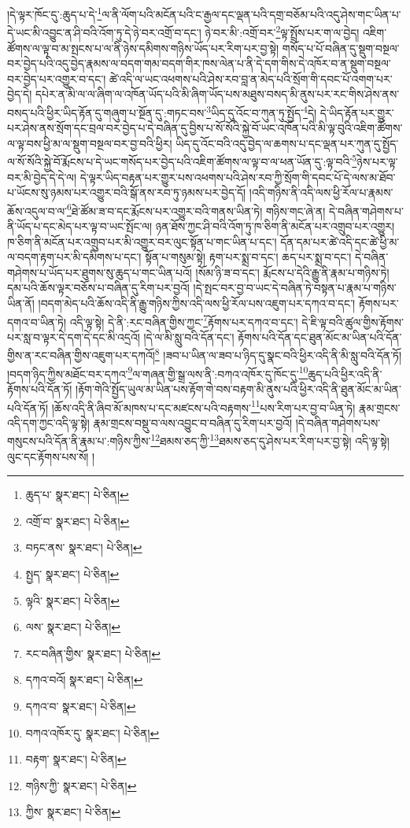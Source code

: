 །དེ་ལྟར་ཁོང་དུ་:ཆུད་པ་དེ་\footnote{ཆུད་པ་  སྣར་ཐང་།  པེ་ཅིན། }ལ་ནི་ལོག་པའི་མངོན་པའི་ང་རྒྱལ་དང་ལྡན་པའི་དགྲ་བཅོམ་པའི་འདུ་ཤེས་གང་ཡིན་པ་དེ་ཡང་མི་འབྱུང་ན་ཤི་བའི་འོག་ཏུ་དེ་ཉེ་བར་འགྲོ་བ་དང་། ཉེ་བར་མི་:འགྲོ་བར་\footnote{འགྲོ་བ་  སྣར་ཐང་།  པེ་ཅིན། }ལྟ་སྤྲོས་པར་ག་ལ་བྱེད། འཇིག་ཚོགས་ལ་ལྟ་བ་མ་སྤངས་པ་ལ་ནི་ཉེས་དམིགས་གཉིས་ཡོད་པར་རིག་པར་བྱ་སྟེ། གསོད་པ་པོ་བཞིན་དུ་སྡུག་བསྔལ་བར་བྱེད་པའི་འདུ་བྱེད་རྣམས་ལ་བདག་གམ་བདག་གིར་ཁས་ལེན་པ་ནི་དེ་དག་གིས་དེ་འཁོར་བ་ན་སྡུག་བསྔལ་བར་བྱེད་པར་འགྱུར་བ་དང་། ཚེ་འདི་ལ་ཡང་འཕགས་པའི་ཤེས་རབ་བླ་ན་མེད་པའི་སྲོག་གི་དབང་པོ་འགག་པར་བྱེད་དེ། དཔེར་ན་མི་ལ་ལ་ཞིག་ལ་འཁོན་ཡོད་པའི་མི་ཞིག་ཡོད་པས་མཐུས་བསད་མི་ནུས་པར་རང་གིས་ཤེས་ནས་བསད་པའི་ཕྱིར་ཡིད་རྟོན་དུ་གཞུག་པ་སྔོན་དུ་:གཏང་བས་\footnote{བཏང་ནས་  སྣར་ཐང་།  པེ་ཅིན། }ཡིད་དུ་འོང་བ་ཀུན་ཏུ་སྤྱོད་\footnote{སྤྱད་  སྣར་ཐང་།  པེ་ཅིན། }དེ། དེ་ཡིད་རྟོན་པར་གྱུར་པར་ཤེས་ནས་སྲོག་དང་བྲལ་བར་བྱེད་པ་དེ་བཞིན་དུ་བྱིས་པ་སོ་སོའི་སྐྱེ་བོ་ཡང་འཁོན་པའི་མི་ལྟ་བུའི་འཇིག་ཚོགས་ལ་ལྟ་བས་ཕྱི་མ་ལ་སྡུག་བསྔལ་བར་བྱ་བའི་ཕྱིར། ཡིད་དུ་འོང་བའི་འདུ་བྱེད་ལ་ཆགས་པ་དང་ལྡན་པར་ཀུན་དུ་སྤྱོད་ལ་སོ་སོའི་སྐྱེ་བོ་རྨོངས་པ་དེ་ཡང་གསོད་པར་བྱེད་པའི་འཇིག་ཚོགས་ལ་ལྟ་བ་ལ་ཕན་ཡོན་དུ་:ལྟ་བའི་\footnote{ལྟའི་  སྣར་ཐང་།  པེ་ཅིན། }ཉེས་པར་ལྟ་བར་མི་བྱེད་དེ་དེ་ལ། དེ་ལྟར་ཡིད་བརྟན་པར་གྱུར་པས་འཕགས་པའི་ཤེས་རབ་ཀྱི་སྲོག་གི་དབང་པོ་དེ་ལས་མ་ཐོབ་པ་ཡོངས་སུ་ཉམས་པར་འགྱུར་བའི་སྒོ་ནས་རབ་ཏུ་ཉམས་པར་བྱེད་དོ། །འདི་གཉིས་ནི་འདི་ལས་ཕྱི་རོལ་པ་རྣམས་ཆོས་འདུལ་བ་ལ་\footnote{ལས་  སྣར་ཐང་།  པེ་ཅིན། }ཐེ་ཚོམ་ཟ་བ་དང་རྨོངས་པར་འགྱུར་བའི་གནས་ཡིན་ཏེ། གཉིས་གང་ཞེ་ན། དེ་བཞིན་གཤེགས་པ་ནི་ཡོད་པ་དང་མེད་པར་ལྟ་བ་ཡང་སྤོང་ལ། ཉན་ཐོས་ཀྱང་ཤི་བའི་འོག་ཏུ་ཁ་ཅིག་ནི་མངོན་པར་འགྲུབ་པར་འགྱུར། ཁ་ཅིག་ནི་མངོན་པར་འགྲུབ་པར་མི་འགྱུར་བར་ལུང་སྟོན་པ་གང་ཡིན་པ་དང་། དོན་དམ་པར་ཚེ་འདི་དང་ཚེ་ཕྱི་མ་ལ་བདག་རྟག་པར་མི་དམིགས་པ་དང་། སྟོན་པ་གསུམ་སྟེ། རྟག་པར་སྨྲ་བ་དང་། ཆད་པར་སྨྲ་བ་དང་། དེ་བཞིན་གཤེགས་པ་ཡོད་པར་ཐུགས་སུ་ཆུད་པ་གང་ཡིན་པའོ། །སོམ་ཉི་ཟ་བ་དང་། རྨོངས་པ་དེའི་རྒྱུ་ནི་རྣམ་པ་གཉིས་ཏེ། དམ་པའི་ཆོས་ལྟར་བཅོས་པ་བཞིན་དུ་རིག་པར་བྱའོ། །དེ་སྤང་བར་བྱ་བ་ཡང་དེ་བཞིན་ཏེ་བསྟན་པ་རྣམ་པ་གཉིས་ཡིན་ནོ། །བདག་མེད་པའི་ཆོས་འདི་ནི་རྒྱུ་གཉིས་ཀྱིས་འདི་ལས་ཕྱི་རོལ་པས་འཇུག་པར་དཀའ་བ་དང་། རྟོགས་པར་དགའ་བ་ཡིན་ཏེ། འདི་ལྟ་སྟེ། དེ་ནི་:རང་བཞིན་གྱིས་ཀྱང་\footnote{རང་བཞིན་གྱིས་  སྣར་ཐང་།  པེ་ཅིན། }རྟོགས་པར་དཀའ་བ་དང་། དེ་ཇི་ལྟ་བའི་ཚུལ་གྱིས་རྟོགས་པར་སླ་བ་ལྟར་དེ་དག་དེ་དང་མི་འདྲའོ། །དེ་ལ་མི་སླུ་བའི་དོན་དང་། རྟོགས་པའི་དོན་དང་ཐུན་མོང་མ་ཡིན་པའི་དོན་གྱིས་ན་རང་བཞིན་གྱིས་འཇུག་པར་དཀའོ།\footnote{དཀའ་བའོ།  སྣར་ཐང་།  པེ་ཅིན། } །ཟབ་པ་ཡིན་ལ་ཟབ་པ་ཉིད་དུ་སྣང་བའི་ཕྱིར་འདི་ནི་མི་སླུ་བའི་དོན་ཏོ། །བདག་ཉིད་ཀྱིས་མཐོང་བར་དཀའ་\footnote{དཀའ་བ་  སྣར་ཐང་།  པེ་ཅིན། }ལ་གཞན་གྱི་སྒྲ་ལས་ནི་:བཀའ་འཁོར་དུ་ཁོང་དུ་\footnote{བཀའ་འཁོར་དུ་  སྣར་ཐང་།  པེ་ཅིན། }ཆུད་པའི་ཕྱིར་འདི་ནི་རྟོགས་པའི་དོན་ཏོ། །རྟོག་གེའི་སྤྱོད་ཡུལ་མ་ཡིན་པས་རྟོག་གེ་བས་བརྟག་མི་ནུས་པའི་ཕྱིར་འདི་ནི་ཐུན་མོང་མ་ཡིན་པའི་དོན་ཏོ། །ཆོས་འདི་ནི་ཞིབ་མོ་མཁས་པ་དང་མཛངས་པའི་བརྟགས་\footnote{བརྟག་  སྣར་ཐང་།  པེ་ཅིན། }པས་རིག་པར་བྱ་བ་ཡིན་ཏེ། རྣམ་གྲངས་འདི་དག་ཀྱང་འདི་ལྟ་སྟེ། རྣམ་གྲངས་བསྡུ་བ་ལས་འབྱུང་བ་བཞིན་དུ་རིག་པར་བྱའོ། །དེ་བཞིན་གཤེགས་པས་གསུངས་པའི་དོན་ནི་རྣམ་པ་:གཉིས་ཀྱིས་\footnote{གཉིས་ཀྱི་  སྣར་ཐང་།  པེ་ཅིན། }ཐམས་ཅད་ཀྱི་\footnote{ཀྱིས་  སྣར་ཐང་།  པེ་ཅིན། }ཐམས་ཅད་དུ་ཤེས་པར་རིག་པར་བྱ་སྟེ། འདི་ལྟ་སྟེ། ལུང་དང་རྟོགས་པས་སོ། །
